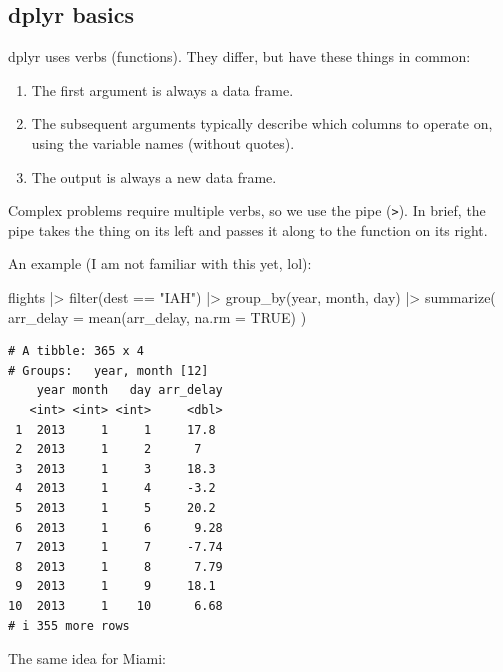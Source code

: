 \documentclass[
  letterpaper,
  DIV=11,
  numbers=noendperiod]{scrreprt}
\newenvironment{Shaded}{\begin{snugshade}}{\end{snugshade}}
\newcommand{\AttributeTok}[1]{\textcolor[rgb]{0.40,0.45,0.13}{#1}}
\newcommand{\ConstantTok}[1]{\textcolor[rgb]{0.56,0.35,0.01}{#1}}
\newcommand{\FunctionTok}[1]{\textcolor[rgb]{0.28,0.35,0.67}{#1}}
\newcommand{\NormalTok}[1]{\textcolor[rgb]{0.00,0.23,0.31}{#1}}
\newcommand{\SpecialCharTok}[1]{\textcolor[rgb]{0.37,0.37,0.37}{#1}}
\newcommand{\StringTok}[1]{\textcolor[rgb]{0.13,0.47,0.30}{#1}}
\providecommand{\tightlist}{%
  \setlength{\itemsep}{0pt}\setlength{\parskip}{0pt}}
\begin{document}
\subsection{dplyr basics}\label{dplyr-basics}

dplyr uses verbs (functions). They differ, but have these things in
common:

\begin{enumerate}
\def\labelenumi{\arabic{enumi}.}
\tightlist
\item
  The first argument is always a data frame.
\item
  The subsequent arguments typically describe which columns to operate
  on, using the variable names (without quotes).
\item
  The output is always a new data frame.
\end{enumerate}

Complex problems require multiple verbs, so we use the pipe
(\texttt{\textbar{}\textgreater{}}). In brief, the pipe takes the thing
on its left and passes it along to the function on its right.

An example (I am not familiar with this yet, lol):

\begin{Shaded}
\begin{Highlighting}[]
\NormalTok{flights }\SpecialCharTok{|\textgreater{}}
  \FunctionTok{filter}\NormalTok{(dest }\SpecialCharTok{==} \StringTok{"IAH"}\NormalTok{) }\SpecialCharTok{|\textgreater{}}
  \FunctionTok{group\_by}\NormalTok{(year, month, day) }\SpecialCharTok{|\textgreater{}}
  \FunctionTok{summarize}\NormalTok{(}
    \AttributeTok{arr\_delay =} \FunctionTok{mean}\NormalTok{(arr\_delay, }\AttributeTok{na.rm =} \ConstantTok{TRUE}\NormalTok{)}
\NormalTok{  )}
\end{Highlighting}
\end{Shaded}

\begin{verbatim}
# A tibble: 365 x 4
# Groups:   year, month [12]
    year month   day arr_delay
   <int> <int> <int>     <dbl>
 1  2013     1     1     17.8 
 2  2013     1     2      7   
 3  2013     1     3     18.3 
 4  2013     1     4     -3.2 
 5  2013     1     5     20.2 
 6  2013     1     6      9.28
 7  2013     1     7     -7.74
 8  2013     1     8      7.79
 9  2013     1     9     18.1 
10  2013     1    10      6.68
# i 355 more rows
\end{verbatim}

The same idea for Miami:
\end{document}
